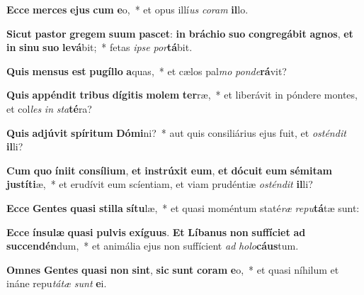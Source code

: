 \item \textbf{Ec}\textbf{ce} \textbf{mer}\textbf{ces} \textbf{e}\textbf{jus} \textbf{cum} \textbf{e}o,~* et opus illí\textit{us} \textit{co}\textit{ram} \textbf{il}lo.
\item \textbf{Sic}\textbf{ut} \textbf{pas}\textbf{tor} \textbf{gre}\textbf{gem} \textbf{su}\textbf{um} \textbf{pa}\textbf{scet}: \textbf{in} \textbf{brá}\textbf{chi}\textbf{o} \textbf{su}\textbf{o} \textbf{con}\textbf{gre}\textbf{gá}\textbf{bit} \textbf{a}\textbf{gnos}, \textbf{et} \textbf{in} \textbf{si}\textbf{nu} \textbf{su}\textbf{o} \textbf{le}\textbf{vá}bit;~* fetas \textit{ip}\textit{se} \textit{por}\textbf{tá}bit.
\item \textbf{Quis} \textbf{men}\textbf{sus} \textbf{est} \textbf{pu}\textbf{gíl}\textbf{lo} \textbf{a}quas,~* et cælos pal\textit{mo} \textit{pon}\textit{de}\textbf{rá}vit?
\item \textbf{Quis} \textbf{ap}\textbf{pén}\textbf{dit} \textbf{tri}\textbf{bus} \textbf{dí}\textbf{gi}\textbf{tis} \textbf{mo}\textbf{lem} \textbf{ter}ræ,~* et liberávit in póndere montes, et col\textit{les} \textit{in} \textit{sta}\textbf{té}ra?
\item \textbf{Quis} \textbf{ad}\textbf{jú}\textbf{vit} \textbf{spí}\textbf{ri}\textbf{tum} \textbf{Dó}\textbf{mi}ni?~* aut quis consiliárius ejus fuit, et \textit{os}\textit{tén}\textit{dit} \textbf{il}li?
\item \textbf{Cum} \textbf{quo} \textbf{ín}\textbf{i}\textbf{it} \textbf{con}\textbf{sí}\textbf{li}\textbf{um}, \textbf{et} \textbf{in}\textbf{strú}\textbf{xit} \textbf{e}\textbf{um}, \textbf{et} \textbf{dó}\textbf{cu}\textbf{it} \textbf{e}\textbf{um} \textbf{sé}\textbf{mi}\textbf{tam} \textbf{jus}\textbf{tí}\textbf{ti}æ,~* et erudívit eum scíentiam, et viam prudéntiæ \textit{os}\textit{tén}\textit{dit} \textbf{il}li?
\item \textbf{Ec}\textbf{ce} \textbf{Gen}\textbf{tes} \textbf{qua}\textbf{si} \textbf{stil}\textbf{la} \textbf{sí}\textbf{tu}læ,~* et quasi moméntum staté\textit{ræ} \textit{re}\textit{pu}\textbf{tá}tæ sunt:
\item \textbf{Ec}\textbf{ce} \textbf{ín}\textbf{su}\textbf{læ} \textbf{qua}\textbf{si} \textbf{pul}\textbf{vis} \textbf{ex}\textbf{í}\textbf{gu}\textbf{us}. \textbf{Et} \textbf{Lí}\textbf{ba}\textbf{nus} \textbf{non} \textbf{suf}\textbf{fí}\textbf{ci}\textbf{et} \textbf{ad} \textbf{suc}\textbf{cen}\textbf{dén}dum,~* et animália ejus non suffícient \textit{ad} \textit{ho}\textit{lo}\textbf{cáus}tum.
\item \textbf{Om}\textbf{nes} \textbf{Gen}\textbf{tes} \textbf{qua}\textbf{si} \textbf{non} \textbf{sint}, \textbf{sic} \textbf{sunt} \textbf{co}\textbf{ram} \textbf{e}o,~* et quasi níhilum et ináne repu\textit{tá}\textit{tæ} \textit{sunt} \textbf{e}i.
